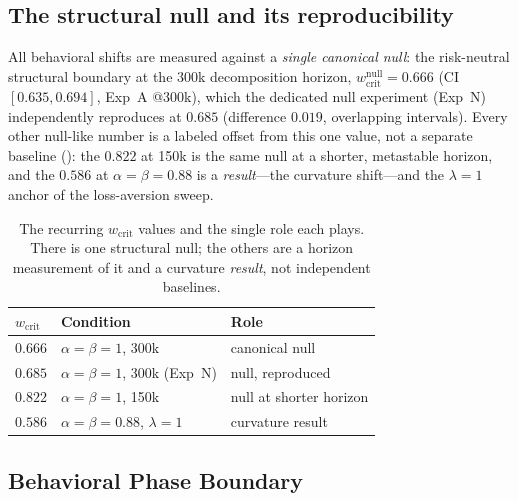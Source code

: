 \documentclass[letterpaper]{article}
\theoremstyle{plain}
\newcommand{\wcrit}{w_{\mathrm{crit}}}
\begin{document}
\subsection{The structural null and its reproducibility}
\label{sec:results_null}

All behavioral shifts are measured against a \emph{single canonical null}: the
risk-neutral structural boundary at the 300k decomposition horizon,
$\wcrit^{\text{null}}=0.666$ (CI $[0.635,0.694]$, Exp~A @300k), which the
dedicated null experiment (Exp~N) independently reproduces at $0.685$
(difference $0.019$, overlapping intervals). Every other null-like number is a
labeled offset from this one value, not a separate baseline
(): the $0.822$ at 150k is the same null at a shorter,
metastable horizon, and the $0.586$ at $\alpha{=}\beta{=}0.88$ is a
\emph{result}---the curvature shift---and the $\lambda{=}1$ anchor of the
loss-aversion sweep.

\begin{table}[tbp]
\centering
\caption{The recurring $\wcrit$ values and the single role each plays. There is
one structural null; the others are a horizon measurement of it and a curvature
\emph{result}, not independent baselines.}
\label{tab:baselines}
\small
\begin{tabular}{lll}
\toprule
$\wcrit$ & Condition & Role \\
\midrule
$0.666$ & $\alpha{=}\beta{=}1$, 300k & canonical null \\
$0.685$ & $\alpha{=}\beta{=}1$, 300k (Exp~N) & null, reproduced \\
$0.822$ & $\alpha{=}\beta{=}1$, 150k & null at shorter horizon \\
$0.586$ & $\alpha{=}\beta{=}0.88$, $\lambda{=}1$ & curvature result \\
\bottomrule
\end{tabular}
\end{table}

\subsection{Behavioral Phase Boundary}
\label{sec:results_behavioral}
\end{document}
